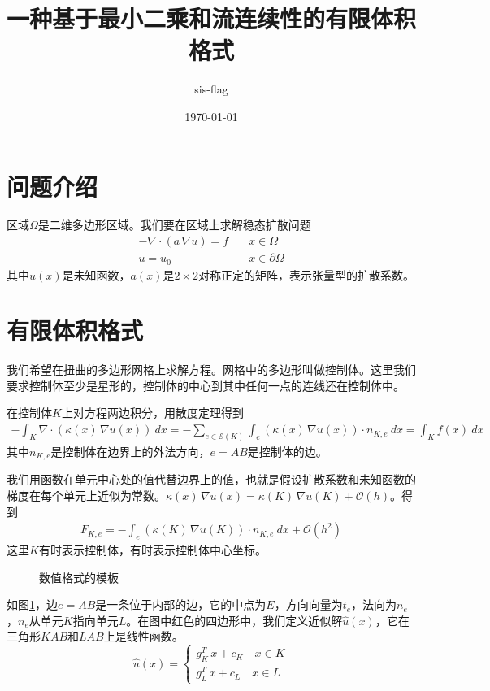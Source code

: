 \documentclass[12pt,a4paper]{article}
\title{一种基于最小二乘和流连续性的有限体积格式}
\author{sis-flag}
\date{\today}
\theoremstyle{plain}
\begin{document}
\maketitle

\section*{问题介绍}

区域$\Omega$是二维多边形区域。我们要在区域上求解稳态扩散问题
\begin{equation}
\begin{split}
- \nabla \cdot (a \, \nabla u)= f & \quad x \in \Omega \\
u = u_0 & \quad x \in \partial \Omega
\end{split}
\end{equation}
其中$u(x)$是未知函数，$a(x)$是$2 \times 2$对称正定的矩阵，表示张量型的扩散系数。

\section*{有限体积格式}

我们希望在扭曲的多边形网格上求解方程。网格中的多边形叫做控制体。这里我们要求控制体至少是星形的，控制体的中心到其中任何一点的连线还在控制体中。

在控制体$K$上对方程两边积分，用散度定理得到
\begin{align*}
- \int_{K} \nabla \cdot (\kappa(x) \, \nabla u(x)) \ dx = - \sum_{e \in \mathcal{E}(K)} \int_{e} (\kappa(x) \, \nabla u(x)) \cdot n_{K, e} \ dx = \int_{K} f(x) \ dx
\end{align*}
其中$n_{K, e}$是控制体在边界上的外法方向，$e = AB$是控制体的边。

我们用函数在单元中心处的值代替边界上的值，也就是假设扩散系数和未知函数的梯度在每个单元上近似为常数。$\kappa(x) \, \nabla u(x) = \kappa(K) \, \nabla u(K) + \mathcal{O}(h)$。得到
\begin{align*}
F_{K, e} = - \int_{e} (\kappa(K) \, \nabla u(K)) \cdot n_{K, e} \ dx + \mathcal{O}(h^2)
\end{align*}
这里$K$有时表示控制体，有时表示控制体中心坐标。

\begin{figure}[h]
\centering
\caption{数值格式的模板}
\label{f1}
\end{figure}

如图\ref{f1}，边$e = AB$是一条位于内部的边，它的中点为$E$，方向向量为$t_e$，法向为$n_e$，$n_e$从单元$K$指向单元$L$。在图中红色的四边形中，我们定义近似解$\hat{u}(x)$，它在三角形$KAB$和$LAB$上是线性函数。
\begin{equation*}
\hat{u}(x) = \left\{
\begin{split}
g_K^T \, x + c_K \quad x \in K \\
g_L^T \, x + c_L \quad x \in L
\end{split}
\right.
\end{equation*}
\end{document}
